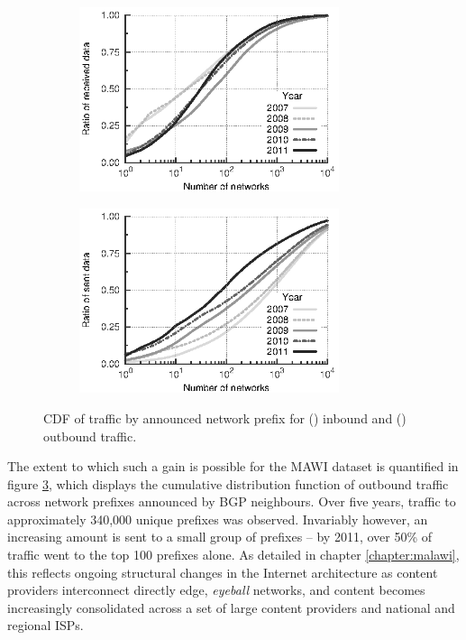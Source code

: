 \begin{figure}[t]
    \begin{subfigure}[b]{0.5\linewidth}
        \centering
        \includegraphics[width=3.0in]{figures/inflex/ecdf_network_dst_data_bytes_from_10000.eps}
        \caption{\label{prefix_in}}
    \end{subfigure}
    \begin{subfigure}[b]{0.5\linewidth}
        \centering
        \includegraphics[width=3.0in]{figures/inflex/ecdf_network_dst_data_bytes_to_10000.eps}
        \caption{\label{prefix_out}}
    \end{subfigure}%
    \caption{\acs{CDF} of traffic by announced network prefix for () inbound and () outbound traffic.\label{fig:prefix}}
    \hfill
\end{figure}

The extent to which such a gain is possible for the \ac{MAWI} dataset is quantified in figure \ref{fig:prefix}, which displays the cumulative distribution function of outbound traffic across network prefixes announced by \ac{BGP} neighbours.
Over five years, traffic to approximately 340,000 unique prefixes was observed.
Invariably however, an increasing amount is sent to a small group of prefixes -- by 2011, over 50\% of traffic went to the top 100 prefixes alone.
As detailed in chapter \ref{chapter:malawi}, this reflects ongoing structural changes in the Internet architecture as content providers interconnect directly edge, \emph{eyeball} networks, and content becomes increasingly consolidated across a set of large content providers and national and regional ISPs.

